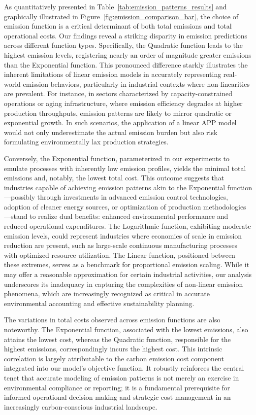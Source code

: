 \begin{table}[htbp]
As quantitatively presented in Table~\ref{tab:emission_patterns_results} and graphically illustrated in Figure~\ref{fig:emission_comparison_bar}, the choice of emission function is a critical determinant of both total emissions and total operational costs.  Our findings reveal a striking disparity in emission predictions across different function types.  Specifically, the Quadratic function leads to the highest emission levels, registering nearly an order of magnitude greater emissions than the Exponential function.  This pronounced difference starkly illustrates the inherent limitations of linear emission models in accurately representing real-world emission behaviors, particularly in industrial contexts where non-linearities are prevalent.  For instance, in sectors characterized by capacity-constrained operations or aging infrastructure, where emission efficiency degrades at higher production throughputs, emission patterns are likely to mirror quadratic or exponential growth. In such scenarios, the application of a linear APP model would not only underestimate the actual emission burden but also risk formulating environmentally lax production strategies.

Conversely, the Exponential function, parameterized in our experiments to emulate processes with inherently low emission profiles, yields the minimal total emissions and, notably, the lowest total cost.  This outcome suggests that industries capable of achieving emission patterns akin to the Exponential function—possibly through investments in advanced emission control technologies, adoption of cleaner energy sources, or optimization of production methodologies—stand to realize dual benefits: enhanced environmental performance and reduced operational expenditures.  The Logarithmic function, exhibiting moderate emission levels, could represent industries where economies of scale in emission reduction are present, such as large-scale continuous manufacturing processes with optimized resource utilization. The Linear function, positioned between these extremes, serves as a benchmark for proportional emission scaling. While it may offer a reasonable approximation for certain industrial activities, our analysis underscores its inadequacy in capturing the complexities of non-linear emission phenomena, which are increasingly recognized as critical in accurate environmental accounting and effective sustainability planning.

The variations in total costs observed across emission functions are also noteworthy.  The Exponential function, associated with the lowest emissions, also attains the lowest cost, whereas the Quadratic function, responsible for the highest emissions, correspondingly incurs the highest cost.  This intrinsic correlation is largely attributable to the carbon emission cost component integrated into our model's objective function.  It robustly reinforces the central tenet that accurate modeling of emission patterns is not merely an exercise in environmental compliance or reporting; it is a fundamental prerequisite for informed operational decision-making and strategic cost management in an increasingly carbon-conscious industrial landscape.


\end{table}
